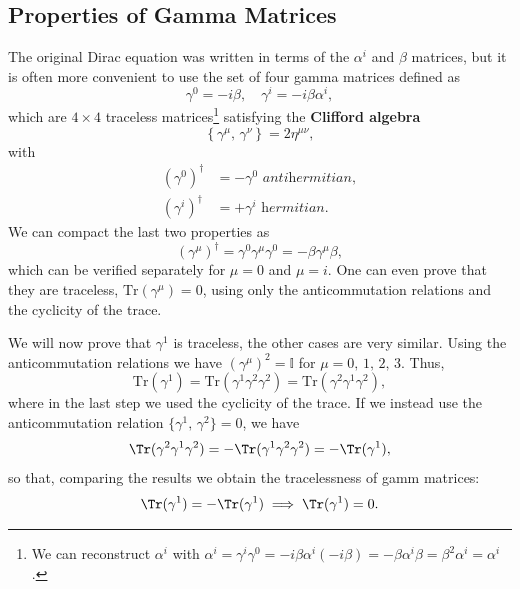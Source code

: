 \subsection{Properties of Gamma Matrices}

The original Dirac equation was written in terms of the \(\alpha^i\) and \(\beta\) matrices, but it is often more convenient to use the set of four gamma matrices defined as
\[
    \gamma^0 = -i \beta, \quad \gamma^i = -i \beta \alpha^i,
\]
which are \(4\times 4\) traceless matrices\footnote{We can reconstruct \(\alpha^i\) with \(\alpha^i = \gamma^i \gamma^0 = -i \beta \alpha^i (-i \beta) = - \beta \alpha^i \beta = \beta^2 \alpha^i = \alpha^i\).} satisfying the \textbf{Clifford algebra}
\[
    \left\{\gamma^{\mu},\, \gamma^{\nu}\right\} = 2 \eta^{\mu \nu},
\]
with
\[
    \begin{aligned}
        \left(\gamma^0\right)^{\dagger} & = - \gamma^0 \textit{ antihermitian}, \\
        \left(\gamma^i\right)^{\dagger} & = + \gamma^i \textit{ hermitian}.
    \end{aligned}
\]
We can compact the last two properties as
\[
    \left(\gamma^{\mu}\right)^{\dagger} = \gamma^0 \gamma^{\mu} \gamma^0 = -\beta \gamma^{\mu} \beta,
\]
which can be verified separately for \(\mu = 0\) and \(\mu = i\). One can even prove that they are traceless, \(\mathrm{Tr}(\gamma^{\mu}) = 0\), using only the anticommutation relations and the cyclicity of the trace.
\begin{example}
    We will now prove that \(\gamma^1\) is traceless, the other cases are very similar. Using the anticommutation relations we have \((\gamma^{\mu})^2 = \mathbb{I}\) for \(\mu = 0,\,1,\,2,\,3\). Thus,
    \[
        \mathrm{Tr}(\gamma^1) = \mathrm{Tr}(\gamma^1 \gamma^2 \gamma^2) = \mathrm{Tr}(\gamma^2 \gamma^1 \gamma^2),
    \]
    where in the last step we used the cyclicity of the trace. If we instead use the anticommutation relation \(\{\gamma^1,\, \gamma^2\} = 0\), we have
    \[
        \Tr(\gamma^2 \gamma^1 \gamma^2) = - \Tr(\gamma^1 \gamma^2 \gamma^2) = - \Tr(\gamma^1),
    \]
    so that, comparing the results we obtain the tracelessness of gamm matrices:
    \[
        \Tr(\gamma^1) = - \Tr(\gamma^1) \implies \Tr(\gamma^1) = 0.
    \]
\end{example}

